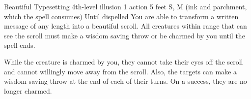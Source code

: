 \documentclass[letterpaper,10pt,twoside,twocolumn,openany]{dndbook}
\begin{document}
\begin{spell}
  {Beautiful Typesetting}
  {4th-level illusion}
  {1 action}
  {5 feet}
  {S, M (ink and parchment, which the spell consumes)}
  {Until dispelled}
  You are able to transform a written message of any length into a beautiful scroll. All creatures within range that can see the scroll must make a wisdom saving throw or be charmed by you until the spell ends.

  While the creature is charmed by you, they cannot take their eyes off the scroll and cannot willingly move away from the scroll. Also, the targets can make a wisdom saving throw at the end of each of their turns. On a success, they are no longer charmed.
\end{spell}

\lipsum[2]
\end{document}
